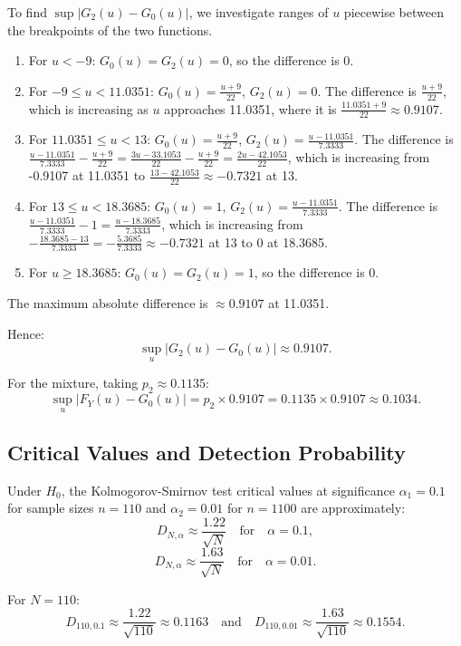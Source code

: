 \documentclass{article}
\begin{document}
To find \(\sup|G_2(u)-G_0(u)|\), we investigate ranges of \(u\) piecewise between the breakpoints of the two functions.

\begin{enumerate}
    \item For \(u < -9\): \(G_0(u) = G_2(u) = 0\), so the difference is 0.
    \item For \(-9 \le u < 11.0351\): \(G_0(u) = \frac{u+9}{22}\), \(G_2(u) = 0\). The difference is \(\frac{u+9}{22}\), which is increasing as \(u\) approaches 11.0351, where it is \(\frac{11.0351 + 9}{22} \approx 0.9107\).
    \item For \(11.0351 \le u < 13\): \(G_0(u) = \frac{u+9}{22}\), \(G_2(u) = \frac{u-11.0351}{7.3333}\). The difference is \(\frac{u-11.0351}{7.3333} - \frac{u+9}{22} = \frac{3u-33.1053}{22} - \frac{u+9}{22} = \frac{2u-42.1053}{22}\), which is increasing from -0.9107 at 11.0351 to \(\frac{13-42.1053}{22} \approx -0.7321\) at 13.
    \item For \(13 \le u < 18.3685\): \(G_0(u) = 1\), \(G_2(u) = \frac{u-11.0351}{7.3333}\). The difference is \(\frac{u-11.0351}{7.3333} - 1 = \frac{u-18.3685}{7.3333}\), which is increasing from \(-\frac{18.3685 - 13}{7.3333} = -\frac{5.3685}{7.3333} \approx -0.7321\) at 13 to 0 at 18.3685.
    \item For \(u \ge 18.3685\): \(G_0(u) = G_2(u) = 1\), so the difference is 0.
\end{enumerate}

The maximum absolute difference is \(\approx 0.9107\) at 11.0351.

Hence:
\[
\sup_u|G_2(u)-G_0(u)| \approx 0.9107.
\]

For the mixture, taking \(p_2 \approx 0.1135\):
\[
\sup_u|F_Y(u)-G_0(u)| = p_2 \times 0.9107 = 0.1135 \times 0.9107 \approx 0.1034.
\]

\subsection{Critical Values and Detection Probability}

Under \(H_0\), the Kolmogorov-Smirnov test critical values at significance \(\alpha_1=0.1\) for sample sizes \(n=110\) and \(\alpha_2=0.01\) for \(n=1100\) are approximately:
\[
D_{N,\alpha} \approx \frac{1.22}{\sqrt{N}} \quad \text{for} \quad \alpha=0.1,
\]
\[
D_{N,\alpha} \approx \frac{1.63}{\sqrt{N}} \quad \text{for} \quad \alpha=0.01.
\]

For \(N=110\):
\[
D_{110,0.1} \approx \frac{1.22}{\sqrt{110}} \approx 0.1163 \quad \text{and} \quad D_{110,0.01} \approx \frac{1.63}{\sqrt{110}} \approx 0.1554.
\]
\end{document}
